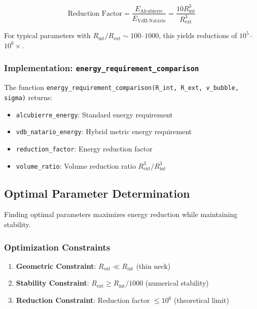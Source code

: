 \begin{equation}
\text{Reduction Factor} = \frac{E_{\text{Alcubierre}}}{E_{\text{VdB-Natário}}} = \frac{10 R_{\text{int}}^3}{R_{\text{ext}}^3}
\end{equation}

For typical parameters with $R_{\text{int}}/R_{\text{ext}} \sim 100$--$1000$, this yields reductions of $10^5$--$10^6\times$.

\subsubsection{Implementation: \texttt{energy\_requirement\_comparison}}

The function \texttt{energy\_requirement\_comparison(R\_int, R\_ext, v\_bubble, sigma)} returns:

\begin{itemize}
\item \texttt{alcubierre\_energy}: Standard energy requirement
\item \texttt{vdb\_natario\_energy}: Hybrid metric energy requirement
\item \texttt{reduction\_factor}: Energy reduction factor
\item \texttt{volume\_ratio}: Volume reduction ratio $R_{\text{ext}}^3/R_{\text{int}}^3$
\end{itemize}

\subsection{Optimal Parameter Determination}

Finding optimal parameters maximizes energy reduction while maintaining stability.

\subsubsection{Optimization Constraints}

\begin{enumerate}
\item \textbf{Geometric Constraint}: $R_{\text{ext}} \ll R_{\text{int}}$ (thin neck)
\item \textbf{Stability Constraint}: $R_{\text{ext}} \geq R_{\text{int}}/1000$ (numerical stability)
\item \textbf{Reduction Constraint}: Reduction factor $\leq 10^6$ (theoretical limit)
\end{enumerate}

